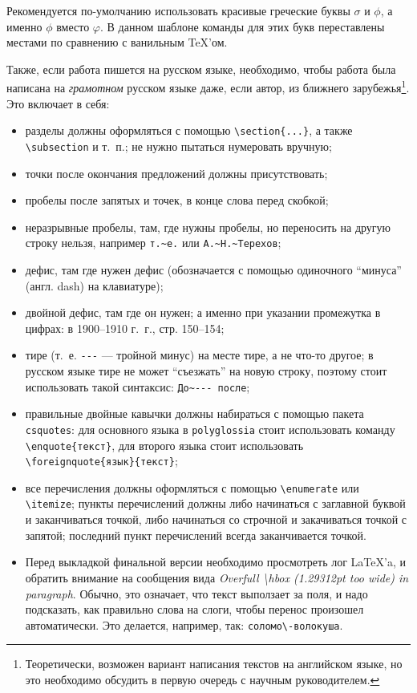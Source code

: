 Рекомендуется по-умол\-ча\-нию использовать красивые греческие бук\-вы $\sigma$  и $\phi$, а именно $\phi$ вместо $\varphi$. В данном шаблоне команды для этих букв переставлены местами по сравнению с ванильным \TeX'ом.

Также, если работа пишется на русском языке, необходимо, чтобы работа была написана на \textit{грамотном} русском языке даже, если автор, из ближнего зарубежья\footnote{
Теоретически, возможен вариант написания текстов на английском языке, но это необходимо обсудить в первую очередь с научным руководителем.}.
Это включает в себя:
\begin{itemize}
  \item разделы должны оформляться с помощью \verb=\section{...}=, а также \verb=\subsection= и т.~п.; не нужно пытаться нумеровать вручную;
  \item точки после окончания предложений должны присутствовать;
  \item пробелы после запятых  и точек, в конце слова перед скобкой;
  \item неразрывные пробелы, там, где нужны пробелы, но переносить на другую строку нельзя, например \verb=т.~е.= или \verb=А.~Н.~Терехов=;
  \item дефис, там где нужен дефис (обозначается с помощью одиночного \enquote{минуса} (англ. dash) на клавиатуре);
  \item двойной дефис, там где он нужен; а именно  при указании проме\-жутка в цифрах: в 1900--1910 г.~г., стр. 150--154;
  \item тире (т.~е. \verb=---= --- тройной минус) на месте тире, а не что-то другое; в русском языке тире не может \enquote{съезжать} на новую строку, поэтому стоит использовать такой синтаксис: \verb=До~--- после=;
  \item правильные двойные кавычки должны набираться с помощью пакета \texttt{csquotes}: для основного языка в \texttt{polyglossia} стоит использовать команду \verb=\enquote{текст}=, для второго языка стоит использовать \verb=\foreignquote{язык}{текст}=;
  \item все перечисления должны оформляться с помощью \verb=\enumerate= или \verb=\itemize=; пункты перечислений должны либо начинаться с заглавной буквой и заканчиваться точкой, либо начинаться со строчной и закачиваться точкой с запятой; последний пункт пере\-числений всегда заканчивается точкой.
  \item Перед выкладкой финальной версии необходимо просмотреть лог \LaTeX'a, и обратить внимание на сообщения вида \emph{Overfull \textbackslash hbox (1.29312pt too wide) in paragraph}. Обычно, это означает, что текст выползает за поля, и надо подсказать, как правильно слова на слоги, чтобы перенос произошел автоматически. Это делается, например, так: \verb=соломо\-волокуша=.
\end{itemize}



